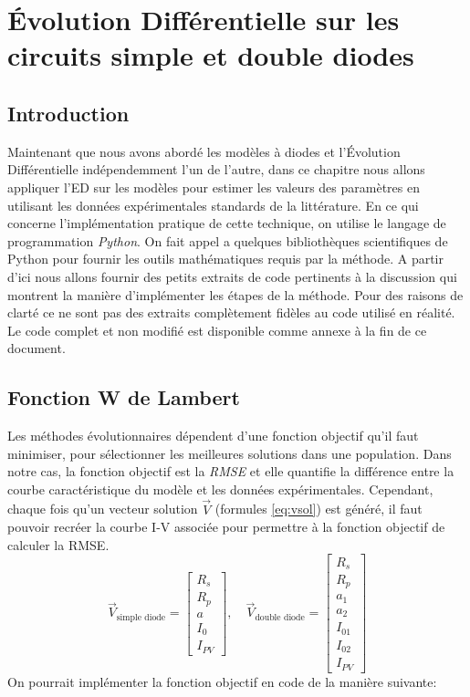 \chapter{Évolution Différentielle sur les circuits simple et double diodes}

\section{Introduction}
Maintenant que nous avons abordé les modèles à diodes et l'Évolution Différentielle indépendemment l'un de l'autre, dans ce chapitre nous allons appliquer l'ED  sur les modèles pour estimer les valeurs des paramètres en utilisant les données expérimentales standards de la littérature. En ce qui concerne l'implémentation pratique de cette technique, on utilise le langage de programmation \textit{Python}. On fait appel a quelques bibliothèques scientifiques de Python pour fournir les outils mathématiques requis par la méthode. A partir d'ici nous allons fournir des petits extraits de code pertinents à la discussion qui montrent la manière d'implémenter les étapes de la méthode. Pour des raisons de clarté ce ne sont pas des extraits complètement fidèles au code utilisé en réalité. Le code complet et non modifié est disponible comme annexe à la fin de ce document. 

\section{Fonction W de Lambert}
Les méthodes évolutionnaires dépendent d'une fonction objectif qu'il faut minimiser, pour sélectionner les meilleures solutions dans une population. Dans notre cas, la fonction objectif est la \textit{RMSE}  et elle quantifie la différence entre la courbe caractéristique du modèle et les données expérimentales. Cependant, chaque fois qu'un vecteur solution $\vec{V}$ (formules \ref{eq:vsol}) est généré, il faut pouvoir recréer la courbe I-V associée pour permettre à la fonction objectif de calculer la RMSE.
\begin{equation}
  \label{eq:vsol}
  \vec{V}_{\text{simple diode}} = 
  \begin{bmatrix}
    R_s\\
    R_{p}\\
    a\\
    I_0\\
    I_{PV}
  \end{bmatrix},
  \quad
  \vec{V}_{\text{double diode}} = 
  \begin{bmatrix}
    R_s\\
    R_{p}\\
    a_1\\
    a_2\\
    I_{01}\\
    I_{02}\\
    I_{PV}
  \end{bmatrix}
\end{equation}
On pourrait implémenter la fonction objectif en code de la manière suivante:\\

